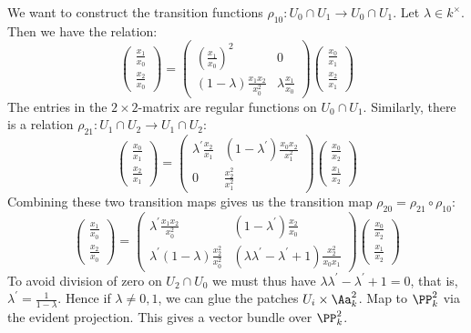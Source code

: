 \documentclass[11pt, english]{article}
\begin{document}
\begin{example}
We want to construct the transition functions $\rho_{10}:U_0 \cap U_1 \to U_0 \cap U_1$. Let $\lambda \in k^\times$. Then we have the relation:
\[
\begin{pmatrix}
\frac{x_1}{x_0} \\
\frac{x_2}{x_0}
\end{pmatrix}
=
\begin{pmatrix}
(\frac{x_1}{x_0})^2 & 0 \\
(1-\lambda) \frac{x_1x_2}{x_0^2} & \lambda \frac{x_1}{x_0} 
\end{pmatrix}
\begin{pmatrix}
\frac{x_0}{x_1} \\
\frac{x_2}{x_1}
\end{pmatrix}
\]
The entries in the $2 \times 2$-matrix are regular functions on $U_0 \cap U_1$. Similarly, there is a relation $\rho_{21}:U_1 \cap U_2 \to U_1 \cap U_2$:
\[
\begin{pmatrix}
\frac{x_0}{x_1} \\
\frac{x_2}{x_1}
\end{pmatrix}
=
\begin{pmatrix}
\lambda^\prime \frac{x_2}{x_1} & (1-\lambda^\prime)\frac{x_0x_2}{x_1^2} \\
0 & \frac{x_2^2}{x_1^2}
\end{pmatrix}
\begin{pmatrix}
\frac{x_0}{x_2} \\
\frac{x_1}{x_2}
\end{pmatrix}
\]
Combining these two transition maps gives us the transition map $\rho_{20}=\rho_{21} \circ \rho_{10}$:
\[
\begin{pmatrix}
\frac{x_1}{x_0} \\
\frac{x_2}{x_0}
\end{pmatrix}
=
\begin{pmatrix}
\lambda^\prime \frac{x_1x_2}{x_0^2} & (1-\lambda^\prime)\frac{x_2}{x_0} \\
\lambda^\prime (1-\lambda) \frac{x_2^2}{x_0^2} & (\lambda \lambda^\prime -\lambda^\prime + 1) \frac{x_2^2}{x_0x_1}
\end{pmatrix}
\begin{pmatrix}
\frac{x_0}{x_2} \\
\frac{x_1}{x_2}
\end{pmatrix}
\]
To avoid division of zero on $U_2 \cap U_0$ we must thus have $\lambda \lambda^\prime -\lambda^\prime + 1=0$, that is, $\lambda^\prime = \frac{1}{1-\lambda}$. Hence if $\lambda \neq 0,1$, we can glue the patches $U_i \times \Aa_k^2$. Map to $\PP_k^2$ via the evident projection. This gives a vector bundle over $\PP_k^2$.
\end{example}
\end{document}
